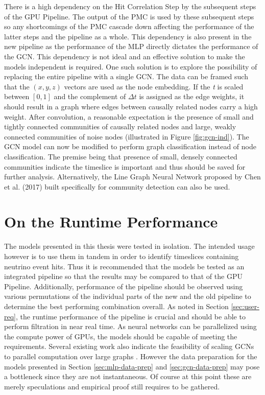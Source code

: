 There is a high dependency on the Hit Correlation Step by the
subsequent steps of the GPU Pipeline. The output of the PMC is used by
these subsequent steps so any shortcomings of the PMC cascade down
affecting the performance of the latter steps and the pipeline as a
whole. This dependency is also present in the new pipeline as the
performance of the MLP directly dictates the performance of the GCN.
This dependency is not ideal and an effective solution to make the
models independent is required. One such solution is to explore the
possibility of replacing the entire pipeline with a single GCN. The
data can be framed such that the $(x, y, z)$ vectors are used as the
node embedding. If the \emph{t} is scaled between $[0, 1]$ and the
complement of $\Delta t$ is assigned as the edge weights, it should
result in a graph where edges between causally related nodes carry a
high weight. After convolution, a reasonable expectation is the
presence of small and tightly connected communities of causally
related nodes and large, weakly connected communities of noise nodes
(illustrated in Figure \ref{fig:gcn-ind}). The GCN model can now be
modified to perform graph classification \cite{zhang2018end} instead
of node classification. The premise being that presence of small,
densely connected communities indicate the timeslice is important and
thus should be saved for further analysis. Alternatively, the Line
Graph Neural Network proposed by Chen et al. (2017) built specifically
for community detection can also be used.

\section{On the Runtime Performance}
The models presented in this thesis were tested in isolation. The
intended usage however is to use them in tandem in order to identify
timeslices containing neutrino event hits. Thus it is recommended that
the models be tested as an integrated pipeline so that the results may
be compared to that of the GPU Pipeline. Additionally, performance of
the pipeline should be observed using various permutations of the
individual parts of the new and the old pipeline to determine the best
performing combination overall. As noted in Section
\ref{sec:user-req}, the runtime performance of the pipeline is crucial
and should be able to perform filtration in near real time. As neural
networks can be parallelized using the compute power of GPUs, the
models should be capable of meeting the requirements. Several existing
work also indicate the feasibility of scaling GCNs to parallel
computation over large graphs \cite{ma2019high, ma2019neugraph,
  zeng2019accurate}. However the data preparation for the models
presented in Section \ref{sec:mlp-data-prep} and
\ref{sec:gcn-data-prep} may pose a bottleneck since they are not
instantaneous. Of course at this point these are merely speculations
and empirical proof still requires to be gathered.

